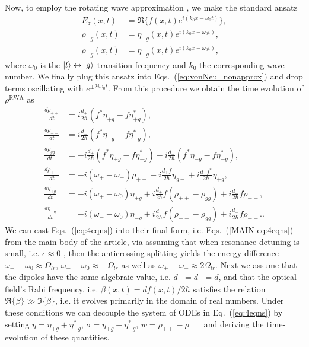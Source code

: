 \documentclass[onecolumn,secnumarabic,amssymb, nobibnotes, aip, prd]{revtex4-1}
\begin{document}
Now, to employ the rotating wave approximation \cite{weiner2011ultrafast}, we make the standard ansatz 
\begin{subequations}
\begin{align}
E_z(x,t) &= \Re\{f(x,t)e^{i(k_0x-\omega_0t)}\}, \\
\rho_{+g}(x,t) &= \eta_{+g}(x,t)e^{i(k_0x-\omega_0t)}, \\
\rho_{-g}(x,t) &= \eta_{-g}(x,t)e^{i(k_0x-\omega_0t)},
\end{align}
\end{subequations}
where $\omega_0$ is the $\ket{l}\leftrightarrow\ket{g}$ transition frequency and $k_0$ the corresponding wave number.  We finally plug this ansatz into Eqs.~(\ref{eq:vonNeu_nonapprox}) and drop terms oscillating with $e^{\pm 2i\omega_0t}$. From this procedure we obtain the time evolution of $\rho^{\text{RWA}}$ as
\begin{subequations}
\label{eq:4eqns}
\begin{align}
\frac{d \rho_{++}}{dt} &= i\frac{d_{+}}{2\hbar}(f^*\eta_{+g}-f\eta_{+g}^*), \\
\frac{d \rho_{--}}{dt} &= i\frac{d_{-}}{2\hbar}(f^*\eta_{-g}-f\eta_{-g}^*), \\
\frac{d \rho_{gg}}{dt} &= - i\frac{d_{+}}{2\hbar}(f^*\eta_{+g}-f\eta_{+g}^*)-i\frac{d_{-}}{2\hbar}(f^*\eta_{-g}-f\eta_{-g}^*), \\
\frac{d \rho_{+-}}{dt} &= -i(\omega_+-\omega_-)\rho_{+-}-i\frac{d_{+}f}{2\hbar}\eta_{g-}+i\frac{d_{-}f^*}{2\hbar}\eta_{+g},\\
\frac{d \eta_{+g}}{dt} &= -i(\omega_+-\omega_{0})\eta_{+g}+i\frac{d_{+}}{2\hbar}f(\rho_{++}-\rho_{gg})+i\frac{d_{-}}{2\hbar}f\rho_{+-}, \label{eq:eta+g}\\
\frac{d \eta_{-g}}{dt} &= -i(\omega_--\omega_{0})\eta_{-g}+i\frac{d_{-}}{2\hbar}f(\rho_{--}-\rho_{gg})+i\frac{d_{+}}{2\hbar}f\rho_{-+}. \label{eq:eta-g}. 
\end{align}
\end{subequations}
We can cast Eqs.~(\ref{eq:4eqns}) into their final form, i.e. Eqs.~(\ref{MAIN-eq:4eqns}) from the main body of the article, via assuming that when resonance detuning is small, i.e. $\epsilon \approx  0$ , then the anticrossing splitting yields the energy difference $\omega_+-\omega_0 \approx \Omega_{lr}$, $\omega_--\omega_0\approx - \Omega_{lr}$ as well as $\omega_+-\omega_- \approx 2\Omega_{lr}$. Next we assume that the dipoles have the same algebraic value, i.e. $d_+ = d_- =d$, and that the optical field's Rabi frequency, i.e. $\beta(x,t) = df(x,t)/2\hbar $ satisfies the relation $\Re\{\beta\} \gg \Im\{\beta\}$, i.e. it evolves primarily in the domain of real numbers. 
Under these conditions we can decouple the system of ODEs in Eq.~(\ref{eq:4eqns}) by setting $\eta = \eta_{+g}+\eta_{-g}^*$, $\sigma = \eta_{+g}-\eta_{-g}^*$, $w = \rho_{++}-\rho_{--}$ and deriving the time-evolution of these quantities.
\end{document}
